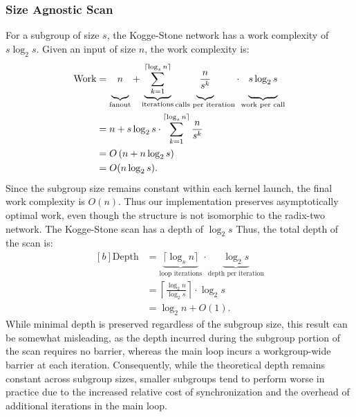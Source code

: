 \documentclass[sigconf]{acmart}
\begin{document}
\subsubsection{Size Agnostic Scan}
For a subgroup of size $s$, the Kogge-Stone network has a work complexity of $s \log_2 s$. Given an input of size $n$, the work complexity is:
\begin{equation}
  \begin{aligned}[b]
    \text{Work} & = \underbrace{\vphantom{\sum_{k=0}^{\lceil \log_s n \rceil}}n}_{\text{fanout}}
    +
    \underbrace{\sum_{k=1}^{\lceil \log_s n \rceil}}_{\text{iterations}}
    \underbrace{\vphantom{\sum_{k=1}^{\lceil \log_s n \rceil}}\frac{n}{s^k}}_{\text{calls per iteration}}
    \cdot
    \underbrace{\vphantom{\sum_{k=1}^{\lceil \log_s n \rceil}}s \log_2 s}_{\text{work per call}} \\
                & = n + s \log_2 s \cdot \sum_{k=1}^{\lceil \log_s n \rceil} \frac{n}{s^k}       \\
                & = O\left(n + n \log_2 s\right)                                                 \\
                & = O(n \log_2 s).
  \end{aligned}
\end{equation}
Since the subgroup size remains constant within each kernel launch, the final work complexity is $O(n)$. Thus our implementation preserves asymptotically optimal work, even though the structure is not isomorphic to the radix-two network. The Kogge-Stone scan has a depth of $\log_2 s$ Thus, the total depth of the scan is:
\begin{equation}
  \begin{aligned}[b]
    \text{Depth} & = \underbrace{\lceil \log_s n \rceil}_{\text{loop iterations}}
    \cdot \underbrace{\log_2 s}_{\text{depth per iteration}}                           \\
                 & = \left\lceil \frac{\log_2 n}{\log_2 s} \right\rceil \cdot \log_2 s \\
                 & = \log_2 n + O(1).
  \end{aligned}
\end{equation}
While minimal depth is preserved regardless of the subgroup size, this result can be somewhat misleading, as the depth incurred during the subgroup portion of the scan requires no barrier, whereas the main loop incurs a workgroup-wide barrier at each iteration. Consequently, while the theoretical depth remains constant across subgroup sizes, smaller subgroups tend to perform worse in practice due to the increased relative cost of synchronization and the overhead of additional iterations in the main loop.
\begin{acks}
\end{acks}
\end{document}
